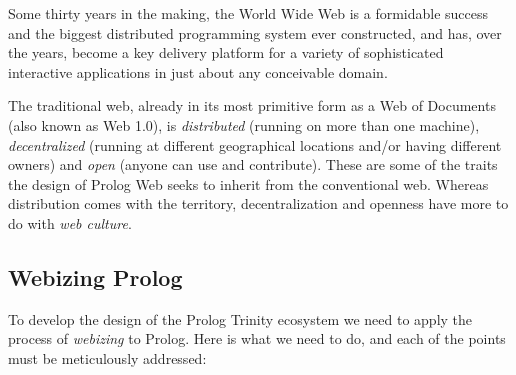 \noindent Some thirty years in the making, the World Wide Web is a formidable success and the biggest distributed programming system ever constructed, and has, over the years, become a key delivery platform for a variety of sophisticated interactive applications in just about any conceivable domain. 

The traditional web, already in its most primitive form as a Web of Documents (also known as Web 1.0), is \textit{distributed} (running on more than one machine), \textit{decentralized} (running at different geographical locations and/or having different owners) and \textit{open} (anyone can use and contribute). These are some of the traits the design of Prolog Web seeks to inherit from the conventional web. Whereas distribution comes with the territory, decentralization and openness have more to do with \textit{web culture}. 

\subsection{Webizing Prolog}

To develop the design of the Prolog Trinity ecosystem we need to apply the process of \textit{webizing} to Prolog. Here is what we need to do, and each of the points must be meticulously addressed:

